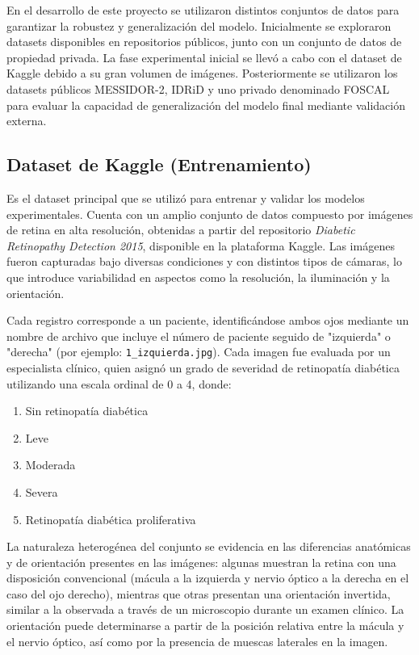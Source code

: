 En el desarrollo de este proyecto se utilizaron distintos conjuntos de datos para garantizar la robustez y generalización del modelo. Inicialmente se exploraron datasets disponibles en repositorios públicos, junto con un conjunto de datos de propiedad privada. La fase experimental inicial se llevó a cabo con el dataset de Kaggle debido a su gran volumen de imágenes. Posteriormente se utilizaron los datasets públicos MESSIDOR-2, IDRiD y uno privado denominado FOSCAL para evaluar la capacidad de generalización del modelo final mediante validación externa.

\subsection{Dataset de Kaggle (Entrenamiento)}

Es el dataset principal que se utilizó para entrenar y validar los modelos experimentales. Cuenta con un amplio conjunto de datos compuesto por imágenes de retina en alta resolución, obtenidas a partir del repositorio \textit{Diabetic Retinopathy Detection 2015}, disponible en la plataforma Kaggle. Las imágenes fueron capturadas bajo diversas condiciones y con distintos tipos de cámaras, lo que introduce variabilidad en aspectos como la resolución, la iluminación y la orientación.

Cada registro corresponde a un paciente, identificándose ambos ojos mediante un nombre de archivo que incluye el número de paciente seguido de "izquierda" o "derecha" (por ejemplo: \texttt{1\_izquierda.jpg}). Cada imagen fue evaluada por un especialista clínico, quien asignó un grado de severidad de retinopatía diabética utilizando una escala ordinal de 0 a 4, donde:

\begin{enumerate}
	\item[0.] Sin retinopatía diabética
	\item[1.] Leve
	\item[2.] Moderada
	\item[3.] Severa
	\item[4.] Retinopatía diabética proliferativa
\end{enumerate}

La naturaleza heterogénea del conjunto se evidencia en las diferencias anatómicas y de orientación presentes en las imágenes: algunas muestran la retina con una disposición convencional (mácula a la izquierda y nervio óptico a la derecha en el caso del ojo derecho), mientras que otras presentan una orientación invertida, similar a la observada a través de un microscopio durante un examen clínico. La orientación puede determinarse a partir de la posición relativa entre la mácula y el nervio óptico, así como por la presencia de muescas laterales en la imagen.

